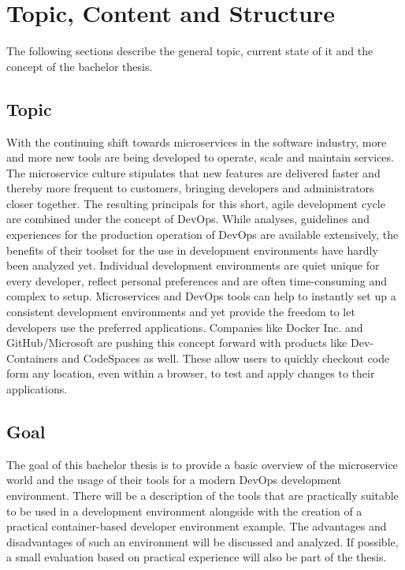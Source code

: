 \documentclass[12pt, a4paper]{article}
\begin{document}
\nocite{*}



\tableofcontents
\newpage
{}
\setcounter{lastroman}{\value{page}}

\pagestyle{plain}

\section{Topic, Content and Structure}
The following sections describe the general topic, current state of it and the concept of the bachelor thesis.
\subsection{Topic}
With the continuing shift towards microservices in the software industry, more and more new tools are being developed to operate, scale and maintain services. The microservice culture stipulates that new features are delivered faster and thereby more frequent to customers, bringing developers and administrators closer together. The resulting principals for this short, agile development cycle are combined under the concept of DevOps. While analyses, guidelines and experiences for the production operation of DevOps are available extensively, the benefits of their toolset for the use in development environments have hardly been analyzed yet.\newline
Individual development environments are quiet unique for every developer, reflect personal preferences and are often time-consuming and complex to setup. Microservices and DevOps tools can help to instantly set up a consistent development environments and yet provide the freedom to let developers use the preferred applications. Companies like Docker Inc. and GitHub/Microsoft are pushing this concept forward with products like Dev-Containers and CodeSpaces as well. These allow users to quickly checkout code form any location, even within a browser, to test and apply changes to their applications.
\subsection{Goal}
The goal of this bachelor thesis is to provide a basic overview of the microservice world and the usage of their tools for a modern DevOps development environment. There will be a description of the tools that are practically suitable to be used in a development environment alongside with the creation of a practical container-based developer environment example. The advantages and disadvantages of such an environment will be discussed and analyzed. If possible, a small evaluation based on practical experience will also be part of the thesis.
\end{document}
